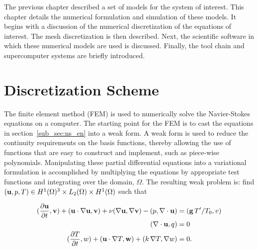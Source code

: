 \label{sec:software}

The previous chapter described a set of models 
for the system of interest. 
This chapter details the numerical formulation
and simulation of these models. It begins with a 
discussion of the numerical discretization of the equations 
of interest. The mesh discretization is then described. 
Next, the scientific software in which these numerical 
models are used is discussed. Finally, the tool
chain and supercomputer systems are briefly introduced. 

\section{Discretization Scheme}
\label{sec:discretization}
The finite element method (FEM) is used to numerically solve the 
Navier-Stokes equations on a computer. The starting point for the FEM is
to cast the equations in section~\ref{sub_sec:ns_en} into a weak
form. A weak form is used to reduce the continuity requirements on the
basis functions, thereby allowing the use of functions that are
easy to construct and implement, such as piece-wise polynomials. 
Manipulating these partial differential equations into a
variational formulation is accomplished by multiplying the equations by
appropriate test functions and integrating over the domain,
$\Omega$. The resulting weak problem is: find $({\bf u},p,T) \in
H^1(\Omega)^3 \times L_2(\Omega) \times H^1(\Omega)$ such that 

%
%
\begin{align}
  (\frac{\partial{\bf u}}{\partial t},{\bf v}) + ({\bf u} \cdot \nabla{\bf
 u},{\bf v}) + \nu (\nabla{\bf u}, \nabla{\bf v})   
  -(p,\nabla \cdot{\bf u}) &= ({\bf g} \, T'/T_0,v)
 \label{eqn:ns_weak} \\
 (\nabla \cdot{\bf u},q) &= 0
 \label{eqn:cont_weak} \\
 (\frac{\partial T}{\partial t}, w) + ({\bf u} \cdot \nabla T,{\bf
 w}) + (k \, \nabla T, \nabla  w) &= 0.\label{eqn:en_weak}
\end{align}

